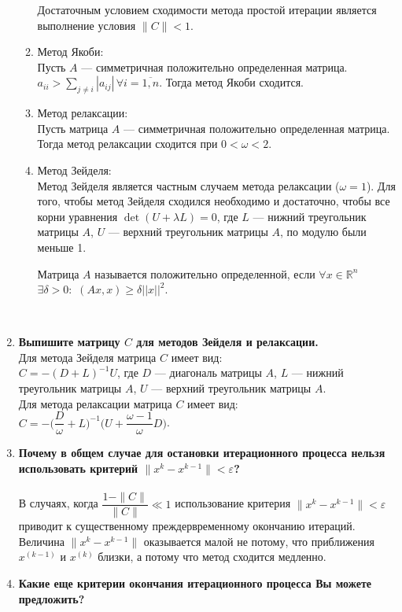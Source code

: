 \documentclass[12pt,a4paper]{article}
\begin{document}
\begin{enumerate}
\begin{enumerate}
Достаточным условием сходимости метода простой итерации является выполнение условия $\|C\|<1$.
\item Метод Якоби:\\
Пусть $A$ --- симметричная положительно определенная матрица. $a_{ii}>\sum\limits_{j \ne i} |a_{ij}| \, \forall i=\overline{1,n}$. Тогда метод Якоби сходится.
\item Метод релаксации:\\
Пусть матрица $A$ --- симметричная положительно определенная матрица. Тогда метод релаксации сходится при $0<\omega<2$.
\item Метод Зейделя:\\
Метод Зейделя является частным случаем метода релаксации ($\omega=1$). Для того, чтобы метод Зейделя сходился необходимо и достаточно, чтобы все корни уравнения $\det (U+\lambda L)=0$, где $L$ --- нижний треугольник матрицы $A$, $U$ --- верхний треугольник матрицы $A$, по модулю были меньше 1.\\
\par
Матрица $A$ называется положительно определенной, если $\forall x\in \mathbb{R}^n$  $\exists \delta >0:$ $(A x,x) \ge \delta ||x||^2$.
\end{enumerate}
\\
\item \textbf{Выпишите матрицу $C$ для методов Зейделя и релаксации.}\\
Для метода Зейделя матрица $C$ имеет вид:\\
 $C=-(D+L)^{-1} U$, где $D$ --- диагональ матрицы $A$, $L$ --- нижний треугольник матрицы $A$, $U$ --- верхний треугольник матрицы $A$.\\
Для метода релаксации матрица $C$ имеет вид:\\
$C=-\Biggr(\dfrac{D}{\omega}+L\Biggl)^{-1} \Biggl(U+\dfrac{\omega-1}{\omega} D\Biggr)$.
\\
\item \textbf{Почему в общем случае для остановки итерационного процесса нельзя использовать критерий $\|x^k-x^{k-1}\|<\varepsilon$?}\\
\\
В случаях, когда $\dfrac{1-\|C\|}{\|C\|}\ll 1$ использование критерия $\|x^k-x^{k-1}\|<\varepsilon$ приводит к существенному преждервременному окончанию итераций. Величина $\|x^k-x^{k-1}\|$ оказывается малой не потому, что приближения $x^{(k-1)}$ и $x^{(k)}$ близки, а потому что метод сходится медленно. 
\\
\item \textbf{Какие еще критерии окончания итерационного процесса Вы можете предложить?}\\

\end{enumerate}
\end{document}

